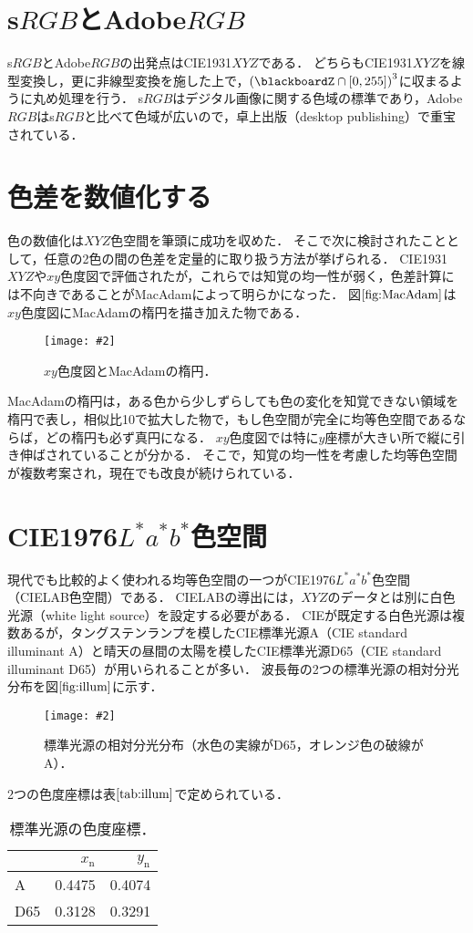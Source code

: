 \documentclass[uplatex,paper=a4,fontsize=4.0truemm,jafontsize=4.0truemm,head_space=30.0truemm,foot_space=30.0truemm,baselineskip=8.0truemm,line_length=40zw,gutter=25.0truemm,oneside,openany,fleqn,hanging_panctuation,open_bracket_pos=nibu_tentsuki,dvipdfmx,jis2004,book,titlepage]{jlreq}
\theoremstyle{mystyle}
\newcommand{\captiondot}[1]{\caption{#1．}}
\newcommand{\figureinput}[4]{\begin{figure}[btp]\centering\texttt{[image: \#2]}\captiondot{#3}\label{fig:#4}\end{figure}}
\newcommand{\tableinput}[4]{\begin{table}[btp]\centering\captiondot{#3}\label{tab:#4}\begin{tabular}{#1}#2\end{tabular}\end{table}}
\newcommand{\mathdisplaystyle}[1]{\(\displaystyle{#1}\)}
\newcommand{\Reference}[1]{\mathdisplaystyle{\ref{#1}}}
\newcommand{\parentheses}[1]{\left(#1\right)}
\newcommand{\squarebrackets}[1]{\left[#1\right]}
\begin{document}
		\section{s\mathdisplaystyle{RGB}とAdobe\mathdisplaystyle{RGB}}
			s\mathdisplaystyle{RGB}とAdobe\mathdisplaystyle{RGB}の出発点はCIE1931\mathdisplaystyle{XYZ}である．
			どちらもCIE1931\mathdisplaystyle{XYZ}を線型変換し，更に非線型変換を施した上で，\mathdisplaystyle{\parentheses{\blackboardZ\cap\squarebrackets{0,255}}^3}に収まるように丸め処理を行う．
			s\mathdisplaystyle{RGB}はデジタル画像に関する色域の標準であり，Adobe\mathdisplaystyle{RGB}はs\mathdisplaystyle{RGB}と比べて色域が広いので，卓上出版（desktop publishing）で重宝されている．
		\section{色差を数値化する}
			色の数値化は\mathdisplaystyle{XYZ}色空間を筆頭に成功を収めた．
			そこで次に検討されたこととして，任意の2色の間の色差を定量的に取り扱う方法が挙げられる．
			CIE1931\mathdisplaystyle{XYZ}や\mathdisplaystyle{xy}色度図で評価されたが，これらでは知覚の均一性が弱く，色差計算には不向きであることがMacAdamによって明らかになった\cite{MacAdam1942}．
			図\Reference{fig:MacAdam}は\mathdisplaystyle{xy}色度図にMacAdamの楕円を描き加えた物である．
			\figureinput{width=\linewidth}{D:/a/figs/MacAdam.png}{\mathdisplaystyle{xy}色度図とMacAdamの楕円}{MacAdam}
			MacAdamの楕円は，ある色から少しずらしても色の変化を知覚できない領域を楕円で表し，相似比10で拡大した物で，もし色空間が完全に均等色空間であるならば，どの楕円も必ず真円になる．
			\mathdisplaystyle{xy}色度図では特に\mathdisplaystyle{y}座標が大きい所で縦に引き伸ばされていることが分かる．
			そこで，知覚の均一性を考慮した均等色空間が複数考案され，現在でも改良が続けられている．
		\section{CIE1976\mathdisplaystyle{L^\ast a^\ast b^\ast}色空間}
			現代でも比較的よく使われる均等色空間の一つがCIE1976\mathdisplaystyle{L^\ast a^\ast b^\ast}色空間（CIELAB色空間）である．
			CIELABの導出には，\mathdisplaystyle{XYZ}のデータとは別に白色光源（white light source）を設定する必要がある．
			CIEが既定する白色光源は複数あるが，タングステンランプを模したCIE標準光源A（CIE standard illuminant A）と晴天の昼間の太陽を模したCIE標準光源D65（CIE standard illuminant D65）が用いられることが多い．
			波長毎の2つの標準光源の相対分光分布を図\Reference{fig:illum}に示す．
			\figureinput{width=\linewidth}{D:/a/figs/illuminant.png}{標準光源の相対分光分布（水色の実線がD65，オレンジ色の破線がA）}{illum}
			2つの色度座標は表\Reference{tab:illum}で定められている．
			\tableinput{l|rr}{ & \(x_\textrm{n}\) & \(y_\textrm{n}\) \\ \hline
				A & 0.4475 & 0.4074 \\
				D65 & 0.3128 & 0.3291}{標準光源の色度座標}{illum}
\end{document}
